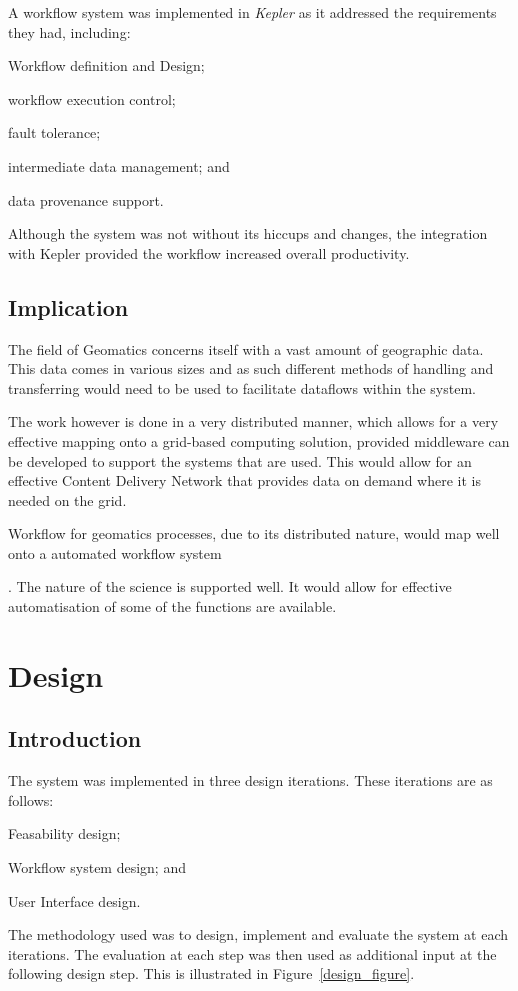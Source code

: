 \documentclass[12pt,a4paper]{report}
\begin{document}
      A workflow system was implemented in \emph{Kepler} as it addressed the
      requirements they had, including: \begin{inparaenum}[(i)] \item Workflow
      definition and Design; \item workflow execution control; \item fault
      tolerance; \item intermediate data management; and \item data provenance
      support.  \end{inparaenum}

      Although the system was not without its hiccups and changes, the
      integration with Kepler provided the workflow increased overall
      productivity.


\section{Implication}
The field of Geomatics concerns itself with a vast amount of geographic data.
This data comes in various sizes and as such different methods of handling and
transferring would need to be used to facilitate dataflows within the system.

The work however is done in a very distributed manner, which allows for a very
effective mapping onto a grid-based computing solution, provided middleware can
be developed to support the systems that are
used\cite{Montella:2007:UGC:1272980.1272995}. This would allow for an
effective Content Delivery Network that provides data on demand where it is
needed on the grid.

Workflow for geomatics processes, due to its distributed nature, would map well
onto a automated workflow system

\cite{Withana:2010:VWE:1851476.1851586}. The nature of the science is supported
well. It would allow for effective automatisation of some of the functions are
available.

\chapter{Design}
\section{Introduction}
The  system was implemented in three design iterations. These iterations are
as follows: \begin{inparaenum}[(i)] \item Feasability design;
\item Workflow system design; and \item User Interface design.
\end{inparaenum} The methodology used was to design, implement
and evaluate the system at each iterations. The evaluation at
each step was then used as additional input at the following
design step. This is illustrated in Figure~\ref{design_figure}.
\end{document}
